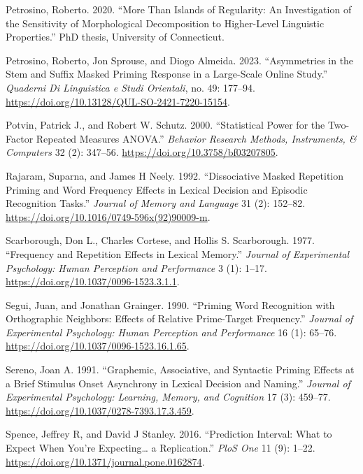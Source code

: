 \documentclass[
]{interact}
\newlength{\cslhangindent}
\newenvironment{CSLReferences}[2] %
 {\begin{list}{}{%
  \setlength{\itemindent}{0pt}
  \setlength{\leftmargin}{0pt}
  \setlength{\parsep}{0pt}
  \ifodd #1
   \setlength{\leftmargin}{\cslhangindent}
   \setlength{\itemindent}{-1\cslhangindent}
  \fi
  \setlength{\itemsep}{#2\baselineskip}}}
 {\end{list}}
\begin{document}
\begin{CSLReferences}{1}{0}
Petrosino, Roberto. 2020. {``More Than Islands of Regularity: An
Investigation of the Sensitivity of Morphological Decomposition to
Higher-Level Linguistic Properties.''} PhD thesis, University of
Connecticut.

Petrosino, Roberto, Jon Sprouse, and Diogo Almeida. 2023. {``Asymmetries
in the Stem and Suffix Masked Priming Response in a Large-Scale Online
Study.''} \emph{Quaderni Di Linguistica e Studi Orientali}, no. 49:
177--94. \url{https://doi.org/10.13128/QUL-SO-2421-7220-15154}.

Potvin, Patrick J., and Robert W. Schutz. 2000. {``Statistical Power for
the Two-Factor Repeated Measures ANOVA.''} \emph{Behavior Research
Methods, Instruments, \& Computers} 32 (2): 347--56.
\url{https://doi.org/10.3758/bf03207805}.

Rajaram, Suparna, and James H Neely. 1992. {``Dissociative Masked
Repetition Priming and Word Frequency Effects in Lexical Decision and
Episodic Recognition Tasks.''} \emph{Journal of Memory and Language} 31
(2): 152--82. \url{https://doi.org/10.1016/0749-596x(92)90009-m}.

Scarborough, Don L., Charles Cortese, and Hollis S. Scarborough. 1977.
{``Frequency and Repetition Effects in Lexical Memory.''} \emph{Journal
of Experimental Psychology: Human Perception and Performance} 3 (1):
1--17. \url{https://doi.org/10.1037/0096-1523.3.1.1}.

Segui, Juan, and Jonathan Grainger. 1990. {``Priming Word Recognition
with Orthographic Neighbors: Effects of Relative Prime-Target
Frequency.''} \emph{Journal of Experimental Psychology: Human Perception
and Performance} 16 (1): 65--76.
\url{https://doi.org/10.1037/0096-1523.16.1.65}.

Sereno, Joan A. 1991. {``Graphemic, Associative, and Syntactic Priming
Effects at a Brief Stimulus Onset Asynchrony in Lexical Decision and
Naming.''} \emph{Journal of Experimental Psychology: Learning, Memory,
and Cognition} 17 (3): 459--77.
\url{https://doi.org/10.1037/0278-7393.17.3.459}.

Spence, Jeffrey R, and David J Stanley. 2016. {``Prediction Interval:
What to Expect When You're Expecting\ldots{} a Replication.''}
\emph{PloS One} 11 (9): 1--22.
\url{https://doi.org/10.1371/journal.pone.0162874}.


\end{CSLReferences}
\end{document}
